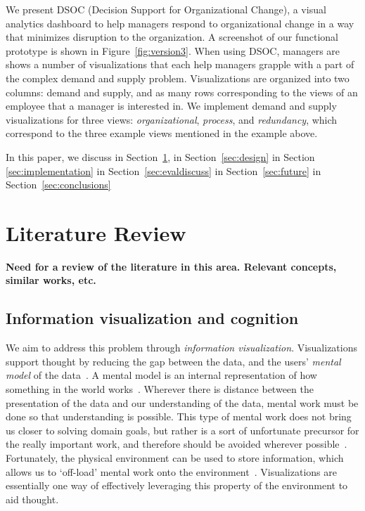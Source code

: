 \documentclass[journal]{vgtc}                %
\begin{document}
We present DSOC (Decision Support for Organizational Change), a visual analytics dashboard to help managers respond to organizational change in a way that minimizes disruption to the organization. A screenshot of our functional prototype is shown in Figure~\ref{fig:version3}. When using DSOC, managers are shows a number of visualizations that each help managers grapple with a part of the complex demand and supply problem. Visualizations are organized into two columns: demand and supply, and as many rows corresponding to the views of an employee that a manager is interested in. We implement demand and supply visualizations for three views: \emph{organizational}, \emph{process}, and \emph{redundancy}, which correspond to the three example views mentioned in the example above. 

In this paper, we discuss \textellipsis in Section~\ref{sec:litreview}, \textellipsis in Section~\ref{sec:design} \textellipsis in Section \ref{sec:implementation} \textellipsis in Section~\ref{sec:evaldiscuss} \textellipsis in Section~\ref{sec:future} \textellipsis in Section~\ref{sec:conclusions}

\section{Literature Review}
\label{sec:litreview}

\textbf{{\color{Plum}Need for a review of the literature in this area. Relevant concepts, similar works, etc.
}}

\subsection{Information visualization and cognition}

We aim to address this problem through \emph{information visualization}. Visualizations support thought by reducing the gap between the data, and the users' \emph{mental model} of the data~\cite{yi2007toward}. A mental model is an internal representation of how something in the world works~\cite{staggersmodel,norman2014some}. Wherever there is distance between the presentation of the data and our understanding of the data, mental work must be done so that understanding is possible. This type of mental work does not bring us closer to solving domain goals, but rather is a sort of unfortunate precursor for the really important work, and therefore should be avoided wherever possible~\cite{paas2003cognitive}. Fortunately, the physical environment can be used to store information, which allows us to \lq off-load\rq{} mental work onto the environment~\cite{wilson2002six}. Visualizations are essentially one way of effectively leveraging this property of the environment to aid thought.
\end{document}
